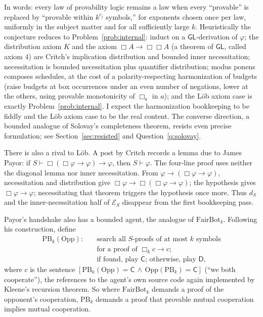 \documentclass[11pt]{amsart}
\theoremstyle{plain}
\theoremstyle{definition}
\newcommand{\GL}{\mathsf{GL}}
\newcommand{\FB}{\mathrm{FairBot}}
\begin{document}
In words: every law of provability logic remains a law when every ``provable'' is replaced by ``provable within $k^{c_j}$ symbols,'' for exponents chosen once per law, uniformly in the subject matter and for all sufficiently large $k$. Heuristically the conjecture reduces to Problem~\ref{prob:internal}: induct on a $\GL$-derivation of $\varphi$; the distribution axiom $K$ and the axiom $\Box A \to \Box\Box A$ (a theorem of $\GL$, called axiom $4$) are Critch's implication distribution and bounded inner necessitation; necessitation is bounded necessitation plus quantifier distribution; modus ponens composes schedules, at the cost of a polarity-respecting harmonization of budgets (raise budgets at box occurrences under an even number of negations, lower at the others, using provable monotonicity of $\Box_a$ in $a$); and the L\"ob axiom case is exactly Problem~\ref{prob:internal}. I expect the harmonization bookkeeping to be fiddly and the L\"ob axiom case to be the real content. The converse direction, a bounded analogue of Solovay's completeness theorem, resists even precise formulation; see Section~\ref{sec:resisted} and Question~\ref{q:solovay}.

There is also a rival to L\"ob. A post by Critch \cite{critchpayor2023} records a lemma due to James Payor: if $S\vdash\Box(\Box\varphi\to\varphi)\to\varphi$, then $S\vdash\varphi$. The four-line proof uses neither the diagonal lemma nor inner necessitation. From $\varphi\to(\Box\varphi\to\varphi)$, necessitation and distribution give $\Box\varphi\to\Box(\Box\varphi\to\varphi)$; the hypothesis gives $\Box\varphi\to\varphi$; necessitating that theorem triggers the hypothesis once more. Thus $d_S$ and the inner-necessitation half of $\mathcal E_S$ disappear from the first bookkeeping pass.

Payor's handshake also has a bounded agent, the analogue of $\FB_k$. Following his construction, define
\[
\begin{aligned}
\mathrm{PB}_k(\mathrm{Opp}):\quad
&\text{search all $S$-proofs of at most $k$ symbols}\\
&\text{for a proof of }\Box_k c\to c;\\
&\text{if found, play $\mathsf C$; otherwise, play $\mathsf D$,}
\end{aligned}
\]
where $c$ is the sentence $[\mathrm{PB}_k(\mathrm{Opp}) = \mathsf{C} \,\wedge\, \mathrm{Opp}(\mathrm{PB}_k) = \mathsf{C}]$ (``we both cooperate''), the references to the agent's own source code again implemented by Kleene's recursion theorem. So where $\FB_k$ demands a proof of the opponent's cooperation, $\mathrm{PB}_k$ demands a proof that provable mutual cooperation implies mutual cooperation.
\end{document}
